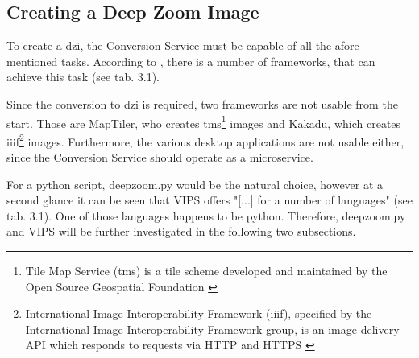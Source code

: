 \subsection{Creating a Deep Zoom Image}

To create a dzi, the Conversion Service must be capable of all the afore mentioned tasks. According to \cite{web:openseadragon}, there is a number of frameworks, that can achieve this task (see tab. 3.1).

Since the conversion to dzi is required, two frameworks are not usable from the start. Those are MapTiler, who creates tms\footnote{Tile Map Service (tms) is a tile scheme developed and maintained by the Open Source Geospatial Foundation \cite{web:tms}} images and Kakadu, which creates iiif\footnote{International Image Interoperability Framework (iiif), specified by the International Image Interoperability Framework group, is an image delivery API which responds to requests via HTTP and HTTPS \cite{web:iiif}} images. Furthermore, the various desktop applications are not usable either, since the Conversion Service should operate as a microservice.

For a python script, deepzoom.py would be the natural choice, however at a second glance it can be seen that VIPS offers "[...] for a number of languages" (see tab. 3.1). One of those languages happens to be python. Therefore, deepzoom.py and VIPS will be further investigated in the following two subsections.

